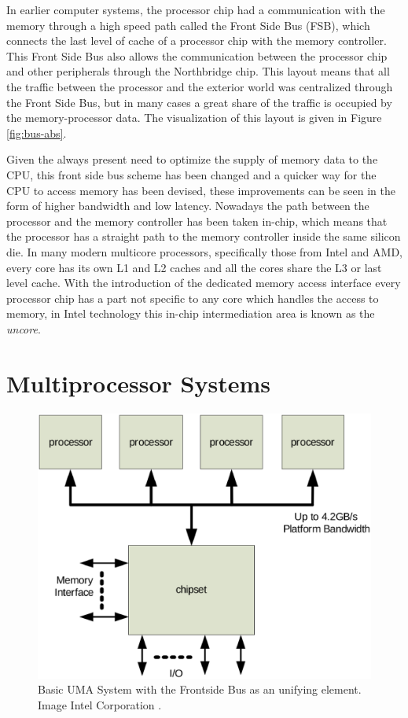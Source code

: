 In earlier computer systems, the processor chip had a communication with the memory through a high speed path called the Front Side Bus (FSB), which connects the last level of cache of a processor chip with the memory controller. This Front Side Bus also allows the communication between the processor chip and other peripherals through the Northbridge chip. This layout means that all the traffic between the processor and the exterior world was centralized through the Front Side Bus, but in many cases a great share of the traffic is occupied by the memory-processor data. The visualization of this layout is given in Figure \ref{fig:bus-abs}. 

Given the always present need to optimize the supply of memory data to the CPU, this front side bus scheme has been changed and a quicker way for the CPU to access memory has been devised, these improvements can be seen in the form of higher bandwidth and low latency. Nowadays the path between the processor and the memory controller has been taken in-chip, which means that the processor has a straight path to the memory controller inside the same silicon die. In many modern multicore processors, specifically those from Intel and AMD, every core has its own L1 and L2 caches and all the cores share the L3 or last level cache. With the introduction of the dedicated memory access interface every processor chip has a part not specific to any core which handles the access to memory, in Intel technology this in-chip intermediation area is known as the \textit{uncore}.

\section{Multiprocessor Systems}\label{section:multiproc}

\begin{figure}[ht]
	\centering
		\includegraphics[width=.6\textwidth]{figures/uma1.eps}
		\caption[Basic UMA System with the Frontside Bus as an unifying element]{Basic UMA System with the Frontside Bus as an unifying element. Image Intel Corporation \cite{qpi-intel}. }
		\label{fig:uma1}
\end{figure}


